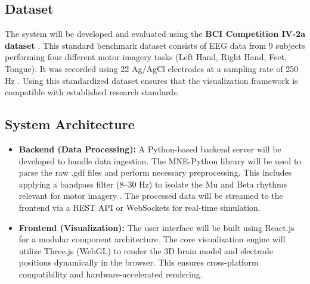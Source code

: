 \subsection{Dataset}
The system will be developed and evaluated using the \textbf{BCI Competition IV-2a dataset} \cite{brunner2008}. This standard benchmark dataset consists of EEG data from 9 subjects performing four different motor imagery tasks (Left Hand, Right Hand, Feet, Tongue). It was recorded using 22 Ag\slash AgCl electrodes at a sampling rate of 250 Hz \cite{brunner2008}. Using this standardized dataset ensures that the visualization framework is compatible with established research standards.

\subsection{System Architecture}
\begin{itemize}
    \item \textbf{Backend (Data Processing):} A Python-based backend server will be developed to handle data ingestion. The MNE-Python library \cite{gramfort2013} will be used to parse the raw .gdf files and perform necessary preprocessing. This includes applying a bandpass filter (8–30 Hz) to isolate the Mu and Beta rhythms relevant for motor imagery \cite{srimadumathi2024}. The processed data will be streamed to the frontend via a REST API or WebSockets for real-time simulation.
    \item \textbf{Frontend (Visualization):} The user interface will be built using React.js for a modular component architecture. The core visualization engine will utilize Three.js (WebGL) to render the 3D brain model and electrode positions dynamically in the browser. This ensures cross-platform compatibility and hardware-accelerated rendering.
\end{itemize}

\clearpage

